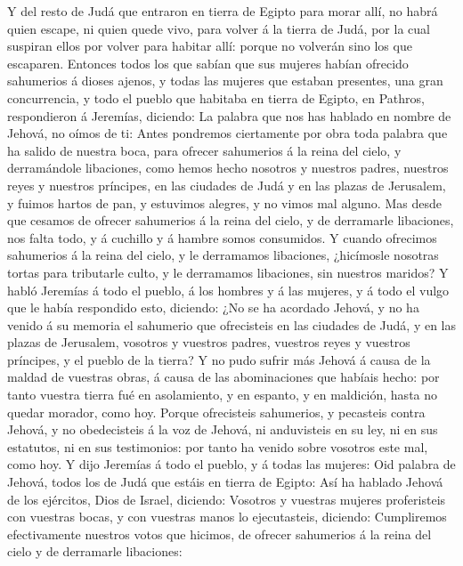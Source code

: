  Y del resto de Judá que entraron en tierra de Egipto para
morar allí, no habrá quien escape, ni quien quede vivo, para volver á la
tierra de Judá, por la cual suspiran ellos por volver para habitar allí:
porque no volverán sino los que escaparen.  Entonces todos
los que sabían que sus mujeres habían ofrecido sahumerios á dioses
ajenos, y todas las mujeres que estaban presentes, una gran
concurrencia, y todo el pueblo que habitaba en tierra de Egipto, en
Pathros, respondieron á Jeremías, diciendo:  La palabra que
nos has hablado en nombre de Jehová, no oímos de ti:  Antes
pondremos ciertamente por obra toda palabra que ha salido de nuestra
boca, para ofrecer sahumerios á la reina del cielo, y derramándole
libaciones, como hemos hecho nosotros y nuestros padres, nuestros reyes
y nuestros príncipes, en las ciudades de Judá y en las plazas de
Jerusalem, y fuimos hartos de pan, y estuvimos alegres, y no vimos mal
alguno.  Mas desde que cesamos de ofrecer sahumerios á la
reina del cielo, y de derramarle libaciones, nos falta todo, y á
cuchillo y á hambre somos consumidos.  Y cuando ofrecimos
sahumerios á la reina del cielo, y le derramamos libaciones, ¿hicímosle
nosotras tortas para tributarle culto, y le derramamos libaciones, sin
nuestros maridos?  Y habló Jeremías á todo el pueblo, á los
hombres y á las mujeres, y á todo el vulgo que le había respondido esto,
diciendo:  ¿No se ha acordado Jehová, y no ha venido á su
memoria el sahumerio que ofrecisteis en las ciudades de Judá, y en las
plazas de Jerusalem, vosotros y vuestros padres, vuestros reyes y
vuestros príncipes, y el pueblo de la tierra?  Y no pudo
sufrir más Jehová á causa de la maldad de vuestras obras, á causa de las
abominaciones que habíais hecho: por tanto vuestra tierra fué en
asolamiento, y en espanto, y en maldición, hasta no quedar morador, como
hoy.  Porque ofrecisteis sahumerios, y pecasteis contra
Jehová, y no obedecisteis á la voz de Jehová, ni anduvisteis en su ley,
ni en sus estatutos, ni en sus testimonios: por tanto ha venido sobre
vosotros este mal, como hoy.  Y dijo Jeremías á todo el
pueblo, y á todas las mujeres: Oid palabra de Jehová, todos los de Judá
que estáis en tierra de Egipto:  Así ha hablado Jehová de
los ejércitos, Dios de Israel, diciendo: Vosotros y vuestras mujeres
proferisteis con vuestras bocas, y con vuestras manos lo ejecutasteis,
diciendo: Cumpliremos efectivamente nuestros votos que hicimos, de
ofrecer sahumerios á la reina del cielo y de derramarle libaciones:
